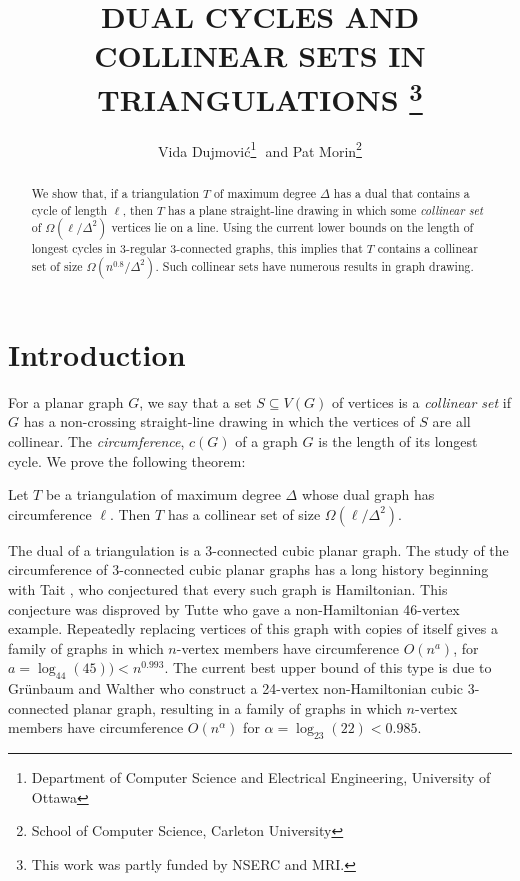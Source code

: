 \documentclass{patmorin}
\title{\MakeUppercase{Dual Cycles and Collinear Sets in Triangulations}%
    \thanks{This work was partly funded by NSERC and MRI.}}
\author{Vida Dujmovi\'c\thanks{Department of Computer Science and Electrical Engineering, University of Ottawa}\,\, and 
        Pat Morin\thanks{School of Computer Science, Carleton University}}
\begin{document}
\maketitle


\begin{abstract}
   We show that, if a triangulation $T$ of maximum degree $\Delta$
   has a dual that contains a cycle of length $\ell$, then $T$ has
   a plane straight-line drawing in which some \emph{collinear set}
   of $\Omega(\ell/\Delta^2)$ vertices lie on a line.  Using the
   current lower bounds on the length of longest cycles in 3-regular
   3-connected graphs, this implies that $T$ contains a collinear set
   of size $\Omega(n^{0.8}/\Delta^2)$.  Such collinear sets have numerous
   results in graph drawing.
\end{abstract}

\section{Introduction}

For a planar graph $G$, we say that a set $S\subseteq V(G)$ of vertices is
a \emph{collinear set} if $G$ has a non-crossing straight-line drawing
in which the vertices of $S$ are all collinear. The \emph{circumference},
 $c(G)$ of a graph $G$ is the length of its longest cycle. We prove the following
theorem:

\begin{thm}
  Let $T$ be a triangulation of maximum degree $\Delta$ whose dual graph
  has circumference $\ell$. Then $T$ has a collinear set of
  size $\Omega(\ell/\Delta^2)$.
\end{thm}

The dual of a triangulation is a 3-connected cubic planar graph.
The study of the circumference of 3-connected cubic planar graphs has
a long history beginning with Tait \cite{X}, who conjectured that every
such graph is Hamiltonian.  This conjecture was disproved by Tutte who
gave a non-Hamiltonian 46-vertex example. Repeatedly replacing vertices
of this graph with copies of itself gives a family of graphs in which
$n$-vertex members have circumference $O(n^a)$, for $a=\log_{44}(45)) <
n^{0.993}$. The current best upper bound of this type is due to Gr\"unbaum
and Walther \cite{grunbaum.walther:shortness} who construct a 24-vertex
non-Hamiltonian cubic 3-connected planar graph, resulting in a family
of graphs in which $n$-vertex members have circumference $O(n^{\alpha})$
for $\alpha=\log_{23}(22)< 0.985$.
\end{document}
